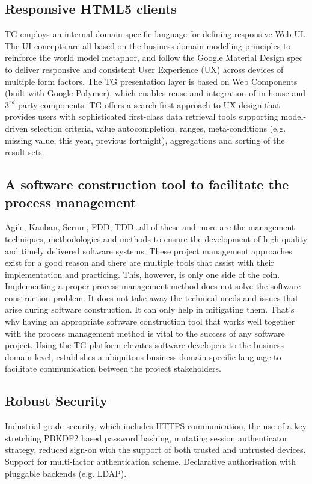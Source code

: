 \documentclass[a4paper,12pt,oneside,openright,final]{memoir} %
\begin{document}
	\BgThispage
\subsection*{Responsive HTML5 clients}
	TG employs an internal domain specific language for defining responsive Web UI.
	The UI concepts are all based on the business domain modelling principles to reinforce the world model metaphor, and follow the Google Material Design spec to deliver responsive and consistent User Experience (UX) across devices of multiple form factors.
	The TG presentation layer is based on Web Components (built with Google Polymer), which enables reuse and integration of in-house and $3^{rd}$ party components.
	TG offers a search-first approach to UX design that provides users with sophisticated first-class data retrieval tools supporting model-driven selection criteria, value autocompletion, ranges, meta-conditions (e.g. missing value, this year, previous fortnight), aggregations and sorting of the result sets. 

	
\subsection*{A software construction tool to facilitate the process management}
	Agile, Kanban, Scrum, FDD, TDD\ldots all of these and more are the management techniques, methodologies and methods to ensure the development of high quality and timely delivered software systems.
	These project management approaches exist for a good reason and there are multiple tools that assist with their implementation and practicing.
	This, however, is only one side of the coin.
	Implementing a proper process management method does not solve the software construction problem.
	It does not take away the technical needs and issues that arise during software construction.
	It can only help in mitigating them.
	That's why having an appropriate software construction tool that works well together with the process management method is vital to the success of any software project.
	Using the TG platform elevates software developers to the business domain level, establishes a ubiquitous business domain specific language to facilitate communication between the project stakeholders.


\subsection*{Robust Security}
	Industrial grade security, which includes HTTPS communication, the use of a key stretching PBKDF2 based password hashing, mutating session authenticator strategy, reduced sign-on with the support of both trusted and untrusted devices. 
	Support for multi-factor authentication scheme. 
	Declarative authorisation with pluggable backends (e.g. LDAP).
\end{document}
